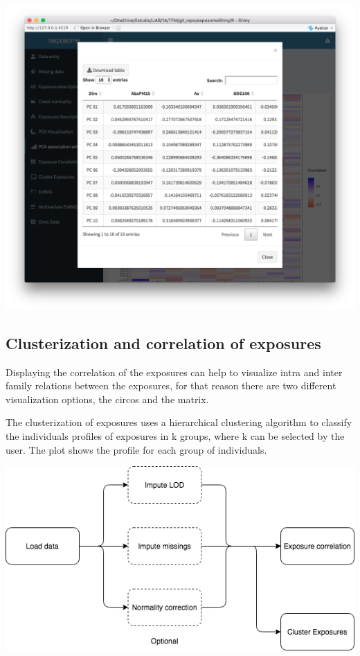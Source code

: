 \documentclass[
]{book}
\begin{document}
\includegraphics{images/analysis5_3_2.png}

\hypertarget{clusterization-and-correlation-of-exposures}{%
\subsection{Clusterization and correlation of exposures}\label{clusterization-and-correlation-of-exposures}}

Displaying the correlation of the exposures can help to visualize intra and inter family relations between the exposures, for that reason there are two different visualization options, the circos and the matrix.

The clusterization of exposures uses a hierarchical clustering algorithm to classify the individuals profiles of exposures in k groups, where k can be selected by the user. The plot shows the profile for each group of individuals.

\includegraphics{images/analysis6_1.png}
\end{document}
